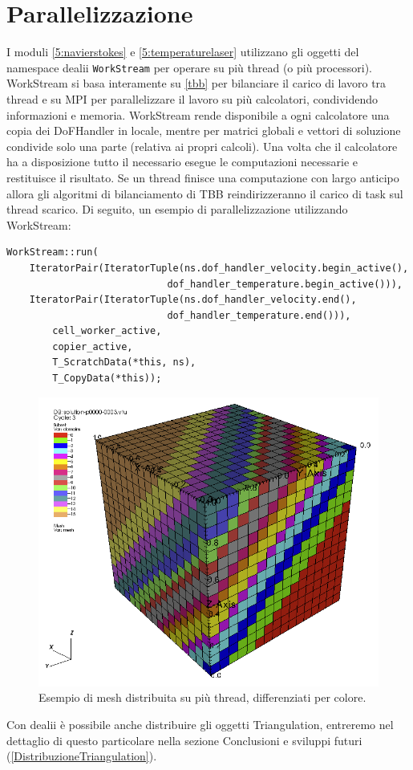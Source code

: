     \section{Parallelizzazione}\label{parallelizzazione}
    I moduli \ref*{5:navierstokes} e \ref*{5:temperaturelaser} utilizzano gli oggetti del namespace dealii \texttt{WorkStream} \cite{TKB16} per operare su più thread (o più processori). 
    WorkStream si basa interamente su \ref*{tbb} per bilanciare il carico di lavoro tra thread e su MPI per parallelizzare il lavoro su più calcolatori, condividendo informazioni e memoria.
    WorkStream rende disponibile a ogni calcolatore una copia dei DoFHandler in locale, mentre per matrici globali e vettori di soluzione condivide solo una parte (relativa ai propri calcoli).
    Una volta che il calcolatore ha a disposizione tutto il necessario esegue le computazioni necessarie e restituisce il risultato. Se un thread finisce una computazione con largo anticipo allora gli algoritmi di bilanciamento 
    di TBB reindirizzeranno il carico di task sul thread scarico. 
    Di seguito, un esempio di parallelizzazione utilizzando WorkStream:
    \begin{verbatim}
WorkStream::run(
    IteratorPair(IteratorTuple(ns.dof_handler_velocity.begin_active(),
                            dof_handler_temperature.begin_active())),
    IteratorPair(IteratorTuple(ns.dof_handler_velocity.end(),
                            dof_handler_temperature.end())),
        cell_worker_active,
        copier_active,
        T_ScratchData(*this, ns),
        T_CopyData(*this));
    \end{verbatim}
    \begin{figure}[H]
        \centering
        \includegraphics[width=\linewidth]{figure/distributedmesh.png}
        \caption{Esempio di mesh distribuita su più thread, differenziati per colore.}
    \end{figure}
    Con dealii è possibile anche distribuire gli oggetti Triangulation, entreremo nel dettaglio di questo particolare nella sezione Conclusioni e sviluppi futuri (\ref*{DistribuzioneTriangulation}).
    
